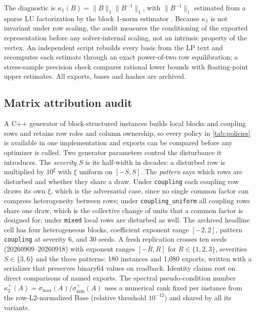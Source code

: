\documentclass[11pt]{article}
\theoremstyle{definition}
\theoremstyle{remark}
\begin{document}
The diagnostic is $\kappa_1(B)=\|B\|_1\|B^{-1}\|_1$, with $\|B^{-1}\|_1$ estimated from a
sparse LU factorization by the block 1-norm estimator \cite{higham2000norm}. Because $\kappa_1$
is not invariant under row scaling, the audit measures the conditioning of the exported
representation before any solver-internal scaling, not an intrinsic property of the vertex. An
independent script rebuilds every basis from the LP text and recomputes each estimate through
an exact power-of-two row equilibration; a stress-sample precision check compares
rational lower bounds with floating-point upper estimates. All exports, bases
and hashes are archived.

\subsection{Matrix attribution audit}
\label{subsec:design-matrix}
A C++ generator of block-structured instances builds local blocks and coupling rows and
retains row roles and column ownership, so every policy in \cref{tab:policies} is available in
one implementation and exports can be compared before any optimizer is called. Two generator
parameters control the disturbance it introduces. The \emph{severity} $S$ is its half-width in
decades: a disturbed row is multiplied by $10^{\xi}$ with $\xi$ uniform on $[-S,S]$. The
\emph{pattern} says which rows are disturbed and whether they share a draw. Under
\texttt{coupling} each coupling row draws its own $\xi$, which is the adversarial case, since
no single common factor can compress heterogeneity between rows; under
\texttt{coupling\_uniform} all coupling rows share one draw, which is the collective change of
units that a common factor is designed for; under \texttt{mixed} local rows are disturbed as
well. The archived headline cell has four heterogeneous blocks, coefficient exponent range
$[-2,2]$, pattern \texttt{coupling} at severity 6, and 30 seeds. A fresh replication crosses
ten seeds (20260909--20260918) with exponent ranges $[-R,R]$ for $R\in\{1,2,3\}$, severities
$S\in\{3,6\}$ and the three patterns: 180 instances and 1,080 exports, written with a
serializer that preserves binary64 values on readback. Identity claims rest on direct comparisons of named
exports. The spectral pseudo-condition number
$\kappa_2^+(A)=\sigma_{\max}(A)/\sigma_{\min}^+(A)$ uses a numerical rank fixed per instance from
the row-L2-normalized Base (relative threshold $10^{-12}$) and shared by all its variants.
\end{document}
